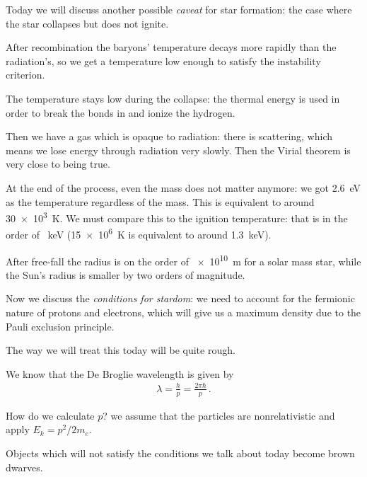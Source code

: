 \documentclass[main.tex]{subfiles}
\begin{document}

Today we will discuss another possible \emph{caveat} for star formation: the case where the star collapses but does not ignite. 

After recombination the baryons' temperature decays more rapidly than the radiation's, so we get a temperature low enough to satisfy the instability criterion. 

The temperature stays low during the collapse: the thermal energy is used in order to break the bonds in  and ionize the hydrogen. 

Then we have a gas which is opaque to radiation: there is scattering, which means we lose energy through radiation very slowly. 
Then the Virial theorem is very close to being true. 

At the end of the process, even the mass does not matter anymore: we got \SI{2.6}{eV} as the temperature regardless of the mass. This is equivalent to around \SI{30e3}{K}.  
We must compare this to the ignition temperature: that is in the order of \SI{}{keV} (\SI{15e6}{K} is equivalent to around \SI{1.3}{keV}). 

After free-fall the radius is on the order of \SI{e10}{m} for a solar mass star, while the Sun's radius is smaller by two orders of magnitude. 

Now we discuss the \emph{conditions for stardom}: we need to account for the fermionic nature of protons and electrons, which will give us a maximum density due to the Pauli exclusion principle. 

The way we will treat this today will be quite rough. 

We know that the De Broglie wavelength is given by 
%
\begin{align}
  \lambda = \frac{h}{p} = \frac{2 \pi \hbar}{p}
\,.
\end{align}

How do we calculate \(p\)? we assume that the particles are nonrelativistic and apply \(E_{k} = p^2 /2m_e\). 

Objects which will not satisfy the conditions we talk about today become brown dwarves. 
\end{document}
